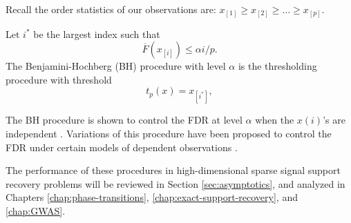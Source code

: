 Recall the order statistics of our observations are: $x_{[1]} \ge x_{[2]}  \ge \ldots \ge x_{[p]}$.
\begin{definition} \label{def:BH}
Let $i^*$ be the largest index such that
$$
\overline{F}(x_{[i]}) \le \alpha i/p.
$$
The Benjamini-Hochberg (BH) procedure with level $\alpha$ is the thresholding procedure with threshold
\begin{equation} \label{eq:BH-procedure}
    t_p(x) = x_{[i^*]},
\end{equation}
\end{definition}
The \ac{BH} procedure is shown to control the FDR at level $\alpha$ when the $x(i)$'s are independent \citep{benjamini1995controlling}. 
 Variations of this procedure have been proposed to control the \ac{FDR} under certain models of dependent observations \citep{benjamini2001control}.



The performance of these procedures in high-dimensional sparse signal support recovery problems will be reviewed in Section \ref{sec:asymptotics}, and analyzed in Chapters \ref{chap:phase-transitions}, \ref{chap:exact-support-recovery}, and \ref{chap:GWAS}.
